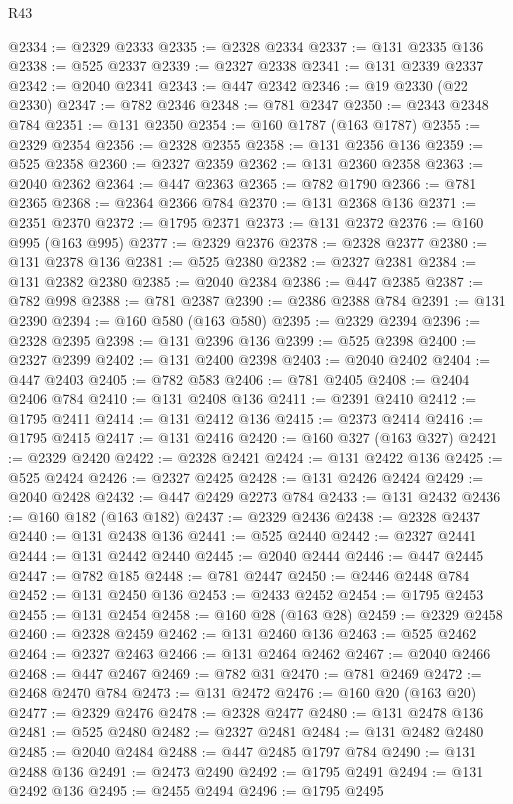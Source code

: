 \begin{lexlean}{R43}
\begin{coremodule}
@2334 := @2329 @2333
@2335 := @2328 @2334
@2337 := @131 @2335 @136
@2338 := @525 @2337
@2339 := @2327 @2338
@2341 := @131 @2339 @2337
@2342 := @2040 @2341
@2343 := @447 @2342
@2346 := @19 @2330 (@22 @2330)
@2347 := @782 @2346
@2348 := @781 @2347
@2350 := @2343 @2348 @784
@2351 := @131 @2350
@2354 := @160 @1787 (@163 @1787)
@2355 := @2329 @2354
@2356 := @2328 @2355
@2358 := @131 @2356 @136
@2359 := @525 @2358
@2360 := @2327 @2359
@2362 := @131 @2360 @2358
@2363 := @2040 @2362
@2364 := @447 @2363
@2365 := @782 @1790
@2366 := @781 @2365
@2368 := @2364 @2366 @784
@2370 := @131 @2368 @136
@2371 := @2351 @2370
@2372 := @1795 @2371
@2373 := @131 @2372
@2376 := @160 @995 (@163 @995)
@2377 := @2329 @2376
@2378 := @2328 @2377
@2380 := @131 @2378 @136
@2381 := @525 @2380
@2382 := @2327 @2381
@2384 := @131 @2382 @2380
@2385 := @2040 @2384
@2386 := @447 @2385
@2387 := @782 @998
@2388 := @781 @2387
@2390 := @2386 @2388 @784
@2391 := @131 @2390
@2394 := @160 @580 (@163 @580)
@2395 := @2329 @2394
@2396 := @2328 @2395
@2398 := @131 @2396 @136
@2399 := @525 @2398
@2400 := @2327 @2399
@2402 := @131 @2400 @2398
@2403 := @2040 @2402
@2404 := @447 @2403
@2405 := @782 @583
@2406 := @781 @2405
@2408 := @2404 @2406 @784
@2410 := @131 @2408 @136
@2411 := @2391 @2410
@2412 := @1795 @2411
@2414 := @131 @2412 @136
@2415 := @2373 @2414
@2416 := @1795 @2415
@2417 := @131 @2416
@2420 := @160 @327 (@163 @327)
@2421 := @2329 @2420
@2422 := @2328 @2421
@2424 := @131 @2422 @136
@2425 := @525 @2424
@2426 := @2327 @2425
@2428 := @131 @2426 @2424
@2429 := @2040 @2428
@2432 := @447 @2429 @2273 @784
@2433 := @131 @2432
@2436 := @160 @182 (@163 @182)
@2437 := @2329 @2436
@2438 := @2328 @2437
@2440 := @131 @2438 @136
@2441 := @525 @2440
@2442 := @2327 @2441
@2444 := @131 @2442 @2440
@2445 := @2040 @2444
@2446 := @447 @2445
@2447 := @782 @185
@2448 := @781 @2447
@2450 := @2446 @2448 @784
@2452 := @131 @2450 @136
@2453 := @2433 @2452
@2454 := @1795 @2453
@2455 := @131 @2454
@2458 := @160 @28 (@163 @28)
@2459 := @2329 @2458
@2460 := @2328 @2459
@2462 := @131 @2460 @136
@2463 := @525 @2462
@2464 := @2327 @2463
@2466 := @131 @2464 @2462
@2467 := @2040 @2466
@2468 := @447 @2467
@2469 := @782 @31
@2470 := @781 @2469
@2472 := @2468 @2470 @784
@2473 := @131 @2472
@2476 := @160 @20 (@163 @20)
@2477 := @2329 @2476
@2478 := @2328 @2477
@2480 := @131 @2478 @136
@2481 := @525 @2480
@2482 := @2327 @2481
@2484 := @131 @2482 @2480
@2485 := @2040 @2484
@2488 := @447 @2485 @1797 @784
@2490 := @131 @2488 @136
@2491 := @2473 @2490
@2492 := @1795 @2491
@2494 := @131 @2492 @136
@2495 := @2455 @2494
@2496 := @1795 @2495

\end{coremodule}
\end{lexlean}
